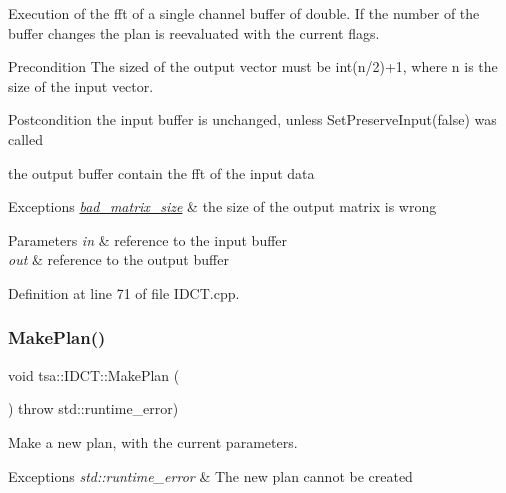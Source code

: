 Execution of the fft of a single channel buffer of double. If the number of the buffer changes the plan is reevaluated with the current flags.

\begin{DoxyPrecond}{Precondition}
The sized of the output vector must be int(n/2)+1, where n is the size of the input vector.
\end{DoxyPrecond}
\begin{DoxyPostcond}{Postcondition}
the input buffer is unchanged, unless Set\+Preserve\+Input(false) was called 

the output buffer contain the fft of the input data
\end{DoxyPostcond}

\begin{DoxyExceptions}{Exceptions}
{\em \hyperlink{classtsa_1_1bad__matrix__size}{bad\+\_\+matrix\+\_\+size}} & the size of the output matrix is wrong \\
\hline
\end{DoxyExceptions}

\begin{DoxyParams}{Parameters}
{\em in} & reference to the input buffer \\
\hline
{\em out} & reference to the output buffer \\
\hline
\end{DoxyParams}


Definition at line 71 of file I\+D\+C\+T.\+cpp.

\mbox{\label{classtsa_1_1_i_d_c_t_a3add06359e79507105820496b324ad7a}} 
\subsubsection{\texorpdfstring{Make\+Plan()}{MakePlan()}}
{\footnotesize\ttfamily void tsa\+::\+I\+D\+C\+T\+::\+Make\+Plan (\begin{DoxyParamCaption}{ }\end{DoxyParamCaption}) throw  std\+::runtime\+\_\+error) \hspace{0.3cm}{\ttfamily [virtual]}}

Make a new plan, with the current parameters.


\begin{DoxyExceptions}{Exceptions}
{\em std\+::runtime\+\_\+error} & The new plan cannot be created \\
\hline
\end{DoxyExceptions}


